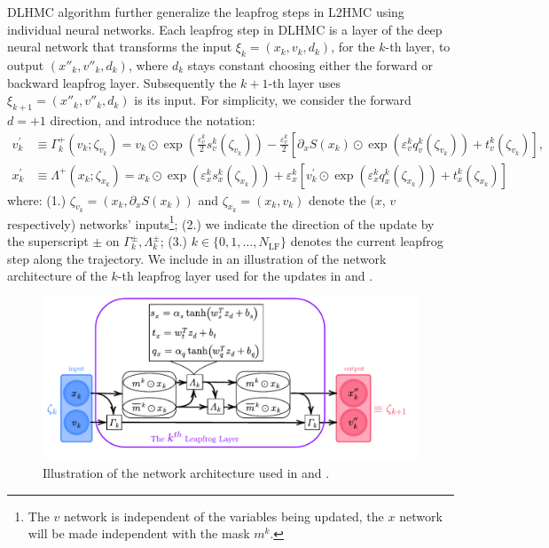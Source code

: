 \documentclass{article} %
\begin{document}
DLHMC algorithm further generalize the leapfrog steps in L2HMC using individual neural networks.
Each leapfrog step in DLHMC is a layer of the deep neural network that transforms the input $\xi_k=(x_k,v_k,d_k)$, for the $k$-th layer,
to output $(x''_k,v''_k,d_k)$, where $d_k$ stays constant choosing either the forward or backward leapfrog layer.
Subsequently the $k+1$-th layer uses $\xi_{k+1}=(x''_k,v''_k,d_k)$ is its input.
For simplicity, we consider the forward \(d=+1\) direction, and introduce the notation:
%
\begin{align}
   v^{\prime}_{k} &\equiv \Gamma^{+}_{k}(v_{k};\zeta_{v_{k}})
   = v_{k}\odot \exp{\left(\tfrac{\varepsilon^{k}_{v}}{2}s_{v}^{k}(\zeta_{v_{k}})\right)} -
   \tfrac{\varepsilon^{k}_{v}}{2}{\left[\partial_{x}S(x_{k})\odot\exp{\left(\varepsilon^{k}_{v} q_{v}^{k}(\zeta_{v_{k}})\right)}
      +t_{v}^{k}(\zeta_{v_{k}})\right]},\label{eq:new_momentum_update}\\
   x^{\prime}_{k} &\equiv \Lambda^{+}(x_{k};\zeta_{x_{k}})
   = x_{k}\odot\exp(\varepsilon^{k}_{x} s^{k}_{x}(\zeta_{x_{k}}))
   + \varepsilon^{k}_{x}\left[v^{\prime}_{k}\odot\exp(\varepsilon^{k}_{x} q^{k}_{x}(\zeta_{x_{k}}))
         + t^{k}_{x}(\zeta_{x_{k}})\right]\label{eq:new_position_update}
\end{align}
%
where: (1.) \(\zeta_{v_{k}} = (x_{k}, \partial_{x}S(x_{k}))\) and \(\zeta_{x_{k}} = (x_{k}, v_{k})\) denote the (\(x\),
\(v\) respectively) networks' inputs\footnote{%
 The $v$ network is independent of the variables being updated,
 the $x$ network will be made independent with the mask $m^k$.};
  (2.) we indicate the direction of the update by the superscript \(\pm\) on \(\Gamma^{\pm}_{k},
\Lambda^{\pm}_{k}\); (3.) \(k\in\{0,1,\ldots,N_{\mathrm{LF}}\}\) denotes the current leapfrog step along the trajectory.
%
We include in  an illustration of the network architecture of the $k$-th leapfrog layer
used for the updates in  and .
%
\begin{figure}[htpb]
   \centering
   \includegraphics[width=\textwidth]{figures/network10.pdf}
   \caption{\label{fig:network}Illustration of the network architecture used in  and .}
\end{figure}
\end{document}
